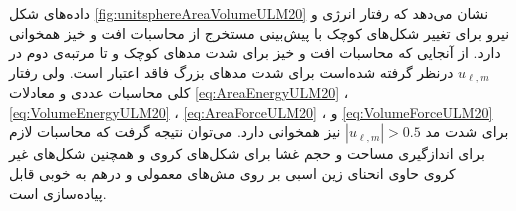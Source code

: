 داده‌های شکل 
\ref{fig:unitsphereAreaVolumeULM20}
نشان می‌دهد که رفتار انرژی و نیرو برای تغییر شکل‌های کوچک با پیش‌بینی مستخرج از محاسبات افت و خیز همخوانی دارد. از آنجایی که محاسبات افت و خیز برای شدت مد‌های کوچک و تا مرتبه‌ی دوم در 
$u_{\ell,m}$
درنظر گرفته شده‌است برای شدت‌ مد‌های بزرگ فاقد اعتبار است. ولی رفتار کلی محاسبات عددی و معادلات
\ref{eq:AreaEnergyULM20}
،
\ref{eq:VolumeEnergyULM20}
،
\ref{eq:AreaForceULM20}
، و
\ref{eq:VolumeForceULM20}
برای شد‌ت مد 
$|u_{\ell,m}|>0.5$
نیز همخوانی دارد. می‌توان نتیجه گرفت که محاسبات لازم برای اندازگیری مساحت و حجم غشا برای شکل‌های کروی و همچنین شکل‌های غیر کروی حاوی انحنای زین اسبی بر روی مش‌های معمولی  و  درهم به خوبی قابل پیاده‌سازی است.










